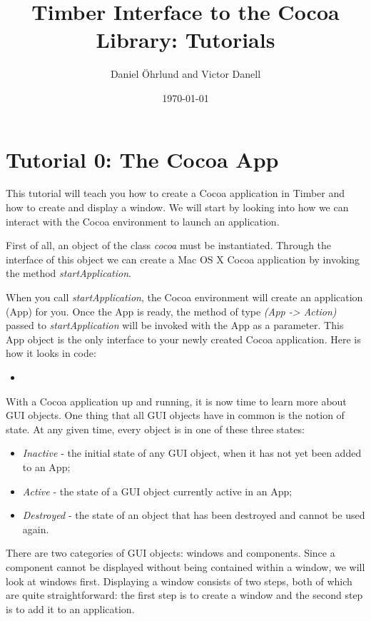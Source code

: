 \documentclass[a4paper]{article}
\newcommand{\timbercode}[2]
  {\begin{itemize}\item[]\end{itemize}}
\begin{document}
\title{\vspace*{3cm} Timber Interface to the Cocoa Library: Tutorials}
\author {Daniel \"{O}hrlund and Victor Danell}
\date{\today}
\maketitle
\thispagestyle{empty}

\newpage

\section*{Tutorial 0: The Cocoa App}
This tutorial will teach you how to create a Cocoa application in Timber and how to create and display a window. We will start by looking into how we can interact with the Cocoa environment to launch an application.

First of all, an object of the class \textit{cocoa} must be instantiated. Through the interface of this object we can create a Mac OS X Cocoa application by invoking the method \textit{startApplication}.

When you call \textit{startApplication}, the Cocoa environment will create an application (App) for you. Once the App is ready, the method of type \textit{(App -> Action)} passed to \textit{startApplication} will be invoked with the App as a parameter. This App object is the only interface to your newly created Cocoa application. Here is how it looks in code:

\timbercode{tutorial0part0}{}

With a Cocoa application up and running, it is now time to learn more about GUI objects. One thing that all GUI objects have in common is the notion of state. At any given time, every object is in one of these three states:
\begin{itemize}
\item\textit{Inactive} - the initial state of any GUI object, when it has not yet been added to an App;
\item\textit{Active} - the state of a GUI object currently active in an App;
\item\textit{Destroyed} - the state of an object that has been destroyed and cannot be used again.
\end{itemize}

There are two categories of GUI objects: windows and components. Since a component cannot be displayed without being contained within a window, we will look at windows first. Displaying a window consists of two steps, both of which are quite straightforward: the first step is to create a window and the second step is to add it to an application.
\end{document}
